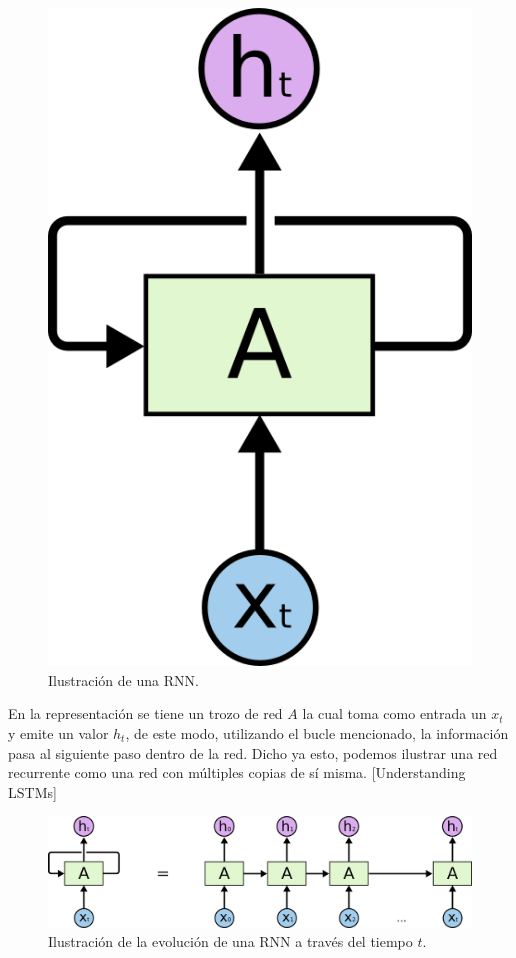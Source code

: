 \documentclass[12pt, letterpaper]{article}
\begin{document}
    \begin{figure}[H]
        \centering
        \includegraphics[width=\linewidth]{img/RNN-rolled.png}
        \caption{Ilustración de una RNN.}
    \end{figure}

    En la representación se tiene un trozo de red $A$ la cual toma como entrada un $x_t$ y emite un valor $h_t$, de este modo, utilizando el bucle mencionado, la información pasa al siguiente paso dentro de la red. Dicho ya esto, podemos ilustrar una red recurrente como una red con múltiples copias de sí misma.
    [Understanding LSTMs]

    \begin{figure}[H]
        \centering
        \includegraphics[width=\linewidth]{img/RNN-unrolled.png}
        \caption{Ilustración de la evolución de una RNN a través del tiempo $t$.}
    \end{figure}
    
\end{document}
